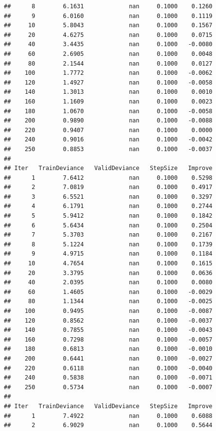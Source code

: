 \documentclass[
]{book}
\begin{document}
\begin{verbatim}
##      8        6.1631             nan     0.1000    0.1260
##      9        6.0160             nan     0.1000    0.1119
##     10        5.8043             nan     0.1000    0.1567
##     20        4.6275             nan     0.1000    0.0715
##     40        3.4435             nan     0.1000   -0.0080
##     60        2.6905             nan     0.1000    0.0048
##     80        2.1544             nan     0.1000    0.0127
##    100        1.7772             nan     0.1000   -0.0062
##    120        1.4927             nan     0.1000   -0.0058
##    140        1.3013             nan     0.1000    0.0010
##    160        1.1609             nan     0.1000    0.0023
##    180        1.0670             nan     0.1000   -0.0058
##    200        0.9890             nan     0.1000   -0.0088
##    220        0.9407             nan     0.1000    0.0000
##    240        0.9016             nan     0.1000   -0.0042
##    250        0.8853             nan     0.1000   -0.0037
## 
## Iter   TrainDeviance   ValidDeviance   StepSize   Improve
##      1        7.6412             nan     0.1000    0.5298
##      2        7.0819             nan     0.1000    0.4917
##      3        6.5521             nan     0.1000    0.3297
##      4        6.1791             nan     0.1000    0.2744
##      5        5.9412             nan     0.1000    0.1842
##      6        5.6434             nan     0.1000    0.2504
##      7        5.3703             nan     0.1000    0.2167
##      8        5.1224             nan     0.1000    0.1739
##      9        4.9715             nan     0.1000    0.1184
##     10        4.7654             nan     0.1000    0.1615
##     20        3.3795             nan     0.1000    0.0636
##     40        2.0395             nan     0.1000    0.0080
##     60        1.4605             nan     0.1000   -0.0029
##     80        1.1344             nan     0.1000   -0.0025
##    100        0.9495             nan     0.1000   -0.0087
##    120        0.8562             nan     0.1000   -0.0037
##    140        0.7855             nan     0.1000   -0.0043
##    160        0.7298             nan     0.1000   -0.0057
##    180        0.6813             nan     0.1000   -0.0010
##    200        0.6441             nan     0.1000   -0.0027
##    220        0.6118             nan     0.1000   -0.0040
##    240        0.5838             nan     0.1000   -0.0071
##    250        0.5734             nan     0.1000   -0.0007
## 
## Iter   TrainDeviance   ValidDeviance   StepSize   Improve
##      1        7.4922             nan     0.1000    0.6088
##      2        6.9029             nan     0.1000    0.5644

\end{verbatim}
\end{document}
